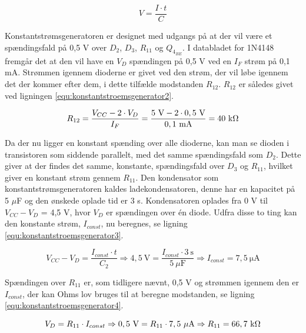 \begin{equation}
\label{equ:konstantstroemsgenerator1}
V = \frac{I \cdot t}{C}
\end{equation}

Konstantstrømsgeneratoren er designet med udgangs på at der vil være et spændingsfald på 0,5 V over $D_2$, $D_3$, $R_{11}$ og $Q_{4_{BE}}$. I databladet for 1N4148 fremgår det at den vil have en $V_D$ spændingen på 0,5 V ved en $I_F$ strøm på 0,1 mA. Strømmen igennem dioderne er givet ved den strøm, der vil løbe igennem det der kommer efter dem, i dette tilfælde modstanden $R_{12}$. $R_{12}$ er således givet ved ligningen \ref{equ:konstantstroemsgenerator2}.

\begin{equation}
\label{equ:konstantstroemsgenerator2}
R_{12} = \frac{V_{CC} - 2 \cdot V_D}{I_F} = \mathrm{\frac{5~V - 2 \cdot 0,5~V}{0,1~mA} = 40~k\ohm}
\end{equation}

Da der nu ligger en konstant spænding over alle dioderne, kan man se dioden i transistoren som siddende parallelt, med det samme spændingsfald som $D_2$. Dette giver at der findes det samme, konstante, spændingsfald over $D_3$ og $R_{11}$, hvilket giver en konstant strøm gennem $R_{11}$.
Den kondensator som konstantstrømsgeneratoren kaldes ladekondensatoren, denne har en kapacitet på 5 $\mu$F og den ønskede oplade tid er 3 s. Kondensatoren oplades fra 0 V til $V_{CC} - V_D$ = 4,5 V, hvor $V_D$ er spændingen over én diode. Udfra disse to ting kan den konstante strøm, $I_{const}$, nu beregnes, se ligning \ref{equ:konstantstroemsgenerator3}.

\begin{equation}
\label{equ:konstantstroemsgenerator3}
V_{CC} - V_D = \frac{I_{const} \cdot t}{C_2} \Rightarrow \mathrm{4,5~V} = \frac{I_{const} \cdot 3~\mathrm{s}}{5~\mu \mathrm{F}} \Rightarrow I_{const} = \mathrm{7,5~\mu A}
\end{equation}

Spændingen over $R_{11}$ er, som tidligere nævnt, 0,5 V og strømmen igennem den er $I_{const}$, der kan Ohms lov bruges til at beregne modstanden, se ligning \ref{equ:konstantstroemsgenerator4}.

\begin{equation}
\label{equ:konstantstroemsgenerator4}
V_D = R_{11} \cdot I_{const} \Rightarrow \mathrm{0,5~V} = R_{11} \cdot \mathrm{7,5~\mu A} \Rightarrow R_{11} = \mathrm{66,7~k\ohm}
\end{equation}

